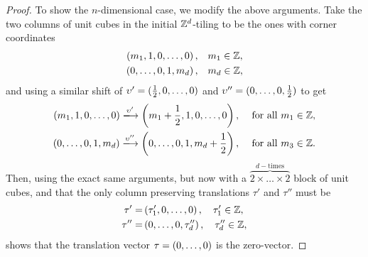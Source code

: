 \documentclass[../thesis.tex]{subfiles}
\begin{document}
\begin{proof}
To show the $n$-dimensional case, we modify the above arguments. Take the two columns of unit cubes in the initial $\mathbb{Z}^d$-tiling to be the ones with corner coordinates
\begin{align*}
    \left(m_1,1,0, \dots,0\right), & \quad m_1 \in \mathbb{Z},\\
    \left(0,\dots,0,1,m_d\right),& \quad m_d \in \mathbb{Z},
\end{align*}
and using a similar shift of $\upsilon' = (\frac{1}{2},0,\dots,0)$ and $\upsilon'' = (0,\dots,0,\frac{1}{2})$ to get
\begin{align*}
    \bracMed{m_1,1,0, \dots,0} \xlongrightarrow[]{\upsilon'} \bracMed{m_1+\frac{1}{2}, 1, 0, \dots, 0}, \quad  &\text{ for all } m_1 \in \Z,\\
    \bracMed{0,\dots,0,1,m_d} \xlongrightarrow[]{\upsilon''} \bracMed{0, \dots, 0, 1, m_d+\frac{1}{2}},    \quad  &\text{ for all }  m_3 \in \Z.
\end{align*}
Then, using the exact same arguments, but now with a $\overbrace{2\times \dots \times 2}^{d-\text{times}}$ block of unit cubes, and that the only column preserving translations $\tau'$ and $\tau''$ must be
\begin{align*}
    \tau' =& \left(\tau'_1,0,\dots,0 \right), \quad \tau'_1 \in \mathbb{Z},\\
    \tau'' =& \left(0,\dots,0,\tau''_d\right), \quad \tau''_d \in \mathbb{Z},
\end{align*}
shows that the translation vector $\tau=(0,\dots,0)$ is the zero-vector.
\end{proof}
\end{document}
